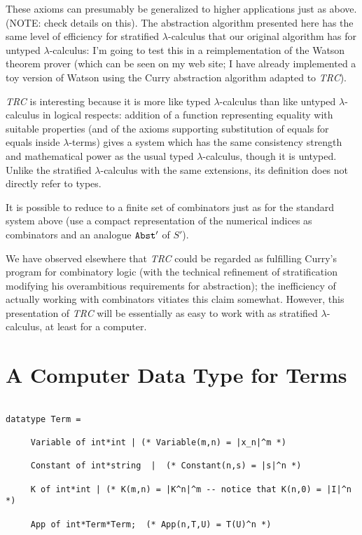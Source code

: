 \documentclass{article}
\begin{document}
These axioms can presumably be generalized to higher applications just as
above.  (NOTE:  check details on this).  The abstraction algorithm presented
here has the same level of efficiency for stratified $\lambda$-calculus
that our original algorithm has for untyped $\lambda$-calculus:  I'm going to
test this in a reimplementation of the Watson theorem prover (which can be
seen on my web site; I have already implemented a toy version of Watson using
the Curry abstraction algorithm adapted to {\em TRC\/}).

{\em TRC\/} is interesting because it is more like typed $\lambda$-calculus
than like untyped $\lambda$-calculus in logical respects:  addition of a
function representing equality with suitable properties (and of the axioms
supporting substitution of equals for equals inside $\lambda$-terms)  gives
a system which has the same consistency strength and mathematical power as
the usual typed $\lambda$-calculus, though it is untyped.  Unlike the 
stratified $\lambda$-calculus with the same extensions, its definition does
not directly refer to types.

It is possible to reduce to a finite set of combinators just as for the
standard system above (use a compact representation of the numerical indices
as combinators and an analogue ${\tt Abst}'$ of $S'$).

We have observed elsewhere that {\em TRC\/} could be regarded as
fulfilling Curry's program for combinatory logic (with the technical
refinement of stratification modifying his overambitious requirements
for abstraction); the inefficiency of actually working with combinators
vitiates this claim somewhat.  However, this presentation of {\em TRC\/}
will be essentially as easy to work with as stratified $\lambda$-calculus,
at least for a computer.

\section {A Computer Data Type for Terms}

\begin{verbatim}

datatype Term =

     Variable of int*int | (* Variable(m,n) = |x_n|^m *)

     Constant of int*string  |  (* Constant(n,s) = |s|^n *)

     K of int*int | (* K(m,n) = |K^n|^m -- notice that K(n,0) = |I|^n *)

     App of int*Term*Term;  (* App(n,T,U) = T(U)^n *)

\end{verbatim}
\end{document}
